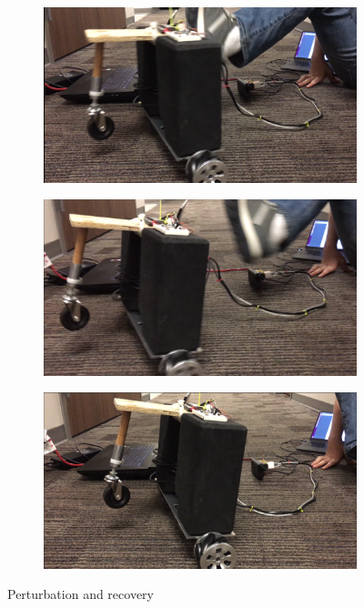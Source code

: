 \documentclass[12pt,conference,onecolumn,titlepage]{IEEEtran} %
\begin{document}
\begin{figure}
  \centering
  \begin{subfigure}{0.3\textwidth}
    \includegraphics[width=\textwidth]{getting_kicked.png}
  \end{subfigure}
  \begin{subfigure}{0.3\textwidth}
        \includegraphics[width=\textwidth]{recovery.png}
  \end{subfigure}
  \begin{subfigure}{0.3\textwidth}
        \includegraphics[width=\textwidth]{recovered.png}
  \end{subfigure} 
  \caption{Perturbation and recovery}
  \label{fig:pertandrec}
\end{figure}
 


\pagebreak
\printbibliography{}
\end{document}
